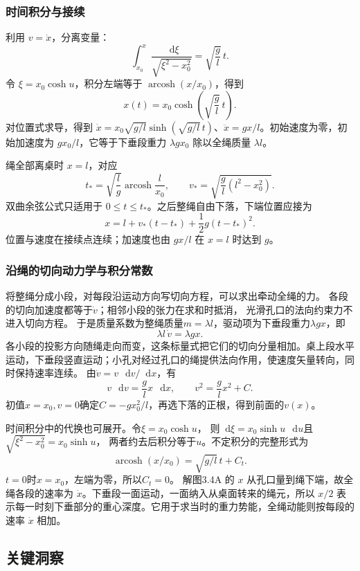 \documentclass[UTF8,fontset=fandol,a4paper,11pt]{ctexart}
\newcommand{\dd}{\mathop{}\!\mathrm{d}}
\begin{document}
\subsubsection*{时间积分与接续}
利用 $v=\dot x$，分离变量：
\[
\int_{x_0}^{x}\frac{\dd\xi}{\sqrt{\xi^2-x_0^2}}
=\sqrt{\frac gl}\,t.
\]
令 $\xi=x_0\cosh u$，积分左端等于 $\operatorname{arcosh}(x/x_0)$，得到
\[
\boxed{x(t)=x_0\cosh\!\left(\sqrt{\frac gl}\,t\right)}.
\]
对位置式求导，得到 $\dot x=x_0\sqrt{g/l}\sinh(\sqrt{g/l}\,t)$、$\ddot x=gx/l$。初始速度为零，初始加速度为 $gx_0/l$，它等于下垂段重力 $\lambda gx_0$ 除以全绳质量 $\lambda l$。

绳全部离桌时 $x=l$，对应
\[
t_*=\sqrt{\frac lg}\operatorname{arcosh}\frac l{x_0},\qquad
v_*=\sqrt{\frac gl(l^2-x_0^2)}.
\]
双曲余弦公式只适用于 $0\leq t\leq t_*$。之后整绳自由下落，下端位置应接为
\[
x=l+v_*(t-t_*)+\frac12g(t-t_*)^2.
\]
位置与速度在接续点连续；加速度也由 $gx/l$ 在 $x=l$ 时达到 $g$。
\subsubsection*{沿绳的切向动力学与积分常数}
将整绳分成小段，对每段沿运动方向写切向方程，可以求出牵动全绳的力。
各段的切向加速度都等于$\dot v$；相邻小段的张力在求和时抵消，
光滑孔口的法向约束力不进入切向方程。
于是质量系数为整绳质量$m=\lambda l$，驱动项为下垂段重力$\lambda gx$，即
\[
\lambda l\,\dot v=\lambda gx.
\]
各小段的投影方向随绳走向而变，这条标量式把它们的切向分量相加。桌上段水平运动，下垂段竖直运动；小孔对经过孔口的绳提供法向作用，使速度矢量转向，同时保持速率连续。
由$\dot v=v\,\dd v/\dd x$，有
\[
v\,\dd v=\frac glx\,\dd x,
\qquad v^2=\frac glx^2+C.
\]
初值$x=x_0,v=0$确定$C=-gx_0^2/l$，再选下落的正根，得到前面的$v(x)$。

时间积分中的代换也可展开。令$\xi=x_0\cosh u$，
则$\dd\xi=x_0\sinh u\,\dd u$且$\sqrt{\xi^2-x_0^2}=x_0\sinh u$，
两者约去后积分等于$u$。不定积分的完整形式为
\[
\operatorname{arcosh}(x/x_0)=\sqrt{g/l}\,t+C_t.
\]
$t=0$时$x=x_0$，左端为零，所以$C_t=0$。
解图3.4A 的 $x$ 从孔口量到绳下端，故全绳各段的速率为 $\dot x$。下垂段一面运动，一面纳入从桌面转来的绳元，所以 $x/2$ 表示每一时刻下垂部分的重心深度。它用于求当时的重力势能，全绳动能则按每段的速率 $\dot x$ 相加。




\subsection*{关键洞察}
\end{document}
